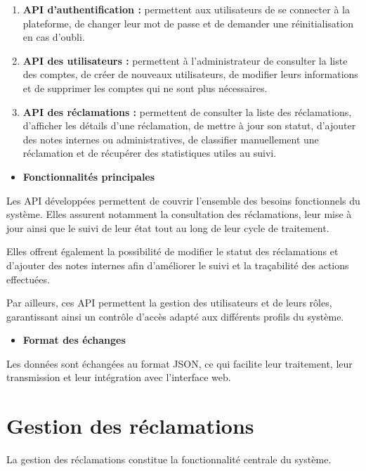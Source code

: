 \documentclass[12pt,a4paper,oneside]{report}
\begin{document}
\begin{enumerate}
    \item \textbf{API d’authentification :} permettent aux utilisateurs de se connecter à la plateforme, de changer leur mot de passe et de demander une réinitialisation en cas d’oubli.
    \item \textbf{API des utilisateurs :} permettent à l’administrateur de consulter la liste des comptes, de créer de nouveaux utilisateurs, de modifier leurs informations et de supprimer les comptes qui ne sont plus nécessaires.
    \item \textbf{API des réclamations :} permettent de consulter la liste des réclamations, d’afficher les détails d’une réclamation, de mettre à jour son statut, d’ajouter des notes internes ou administratives, de classifier manuellement une réclamation et de récupérer des statistiques utiles au suivi.
\end{enumerate}

\begin{itemize}
    \item \textbf{Fonctionnalités principales}
\end{itemize}

Les API développées permettent de couvrir l’ensemble des besoins fonctionnels du système. Elles assurent notamment la consultation des réclamations, leur mise à jour ainsi que le suivi de leur état tout au long de leur cycle de traitement.

Elles offrent également la possibilité de modifier le statut des réclamations et d’ajouter des notes internes afin d’améliorer le suivi et la traçabilité des actions effectuées.

Par ailleurs, ces API permettent la gestion des utilisateurs et de leurs rôles, garantissant ainsi un contrôle d’accès adapté aux différents profils du système.

\begin{itemize}
    \item \textbf{Format des échanges}
\end{itemize}

Les données sont échangées au format JSON, ce qui facilite leur traitement, leur transmission et leur intégration avec l’interface web.

\section{Gestion des réclamations}
La gestion des réclamations constitue la fonctionnalité centrale du système.
\end{document}
